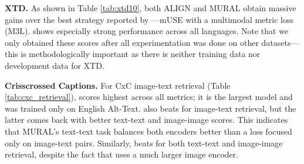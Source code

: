         
        \textbf{XTD.} As shown in Table \ref{tab:xtd10}, both ALIGN and MURAL obtain massive gains over the best strategy reported by \citet{aggarwal2020towards}---mUSE \cite{yang2019multilingual} with a multimodal metric loss (M3L). \murallarge shows especially strong performance across all languages. Note that we only obtained these scores after all experimentation was done on other datasets---this is methodologically important as there is neither training data nor development data for XTD.
        
        
        \begin{table}[t]
        \caption{Semantic Simliarity using CxC.}
        \label{tab:cxc_correlation}
        \end{table}




        






        \textbf{Crisscrossed Captions.} 
        For CxC image-text retrieval (Table \ref{tab:cxc_retrieval}), \alignhuge scores highest across all metrics; it is the largest model and was trained only on English Alt-Text. \alignmling also beats \muralbase for image-text retrieval, but the latter comes back with better text-text and image-image scores. This indicates that MURAL's text-text task balances both encoders better than a loss focused only on image-text pairs. Similarly, \murallarge beats \alignhuge for both text-text and image-image retrieval, despite the fact that \alignhuge uses a much larger image encoder.
        


